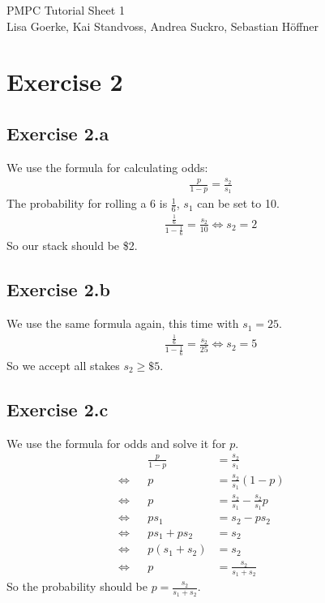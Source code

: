 \documentclass{article}
\begin{document}
\begin{center}
\LARGE PMPC Tutorial Sheet 1\\
\small Lisa Goerke, Kai Standvoss, Andrea Suckro, Sebastian H\"offner
\end{center}
\vspace{0.5cm}
\normalsize


\section*{Exercise 2}
\subsection*{Exercise 2.a}

We use the formula for calculating odds:
\begin{align}
\frac{p}{1-p} = \frac{s_2}{s_1}
\end{align}
The probability for rolling a 6 is $\frac{1}{6}$, $s_1$ can be set to 10.
\begin{align}
\frac{\frac{1}{6}}{1-\frac{1}{6}} = \frac{s_2}{10} \Leftrightarrow s_2 = 2
\end{align}
So our stack should be \$2.


\subsection*{Exercise 2.b}
We use the same formula again, this time with $s_1=25$.
\begin{align}
\frac{\frac{1}{6}}{1-\frac{1}{6}} = \frac{s_2}{25} \Leftrightarrow s_2 = 5
\end{align}
So we accept all stakes $s_2 \geq \$ 5$.


\subsection*{Exercise 2.c}
We use the formula for odds and solve it for $p$.
\begin{align}
                & & \frac{p}{1 - p} & = \frac{s_2}{s_1}                     & & \\
\Leftrightarrow & & p               & = \frac{s_2}{s_1} (1 - p)             & & \\
\Leftrightarrow & & p               & = \frac{s_2}{s_1} - \frac{s_2}{s_1} p & & \\
\Leftrightarrow & & p s_1           & = s_2 - p s_2                         & & \\
\Leftrightarrow & & p s_1 + p s_2   & = s_2                                 & & \\
\Leftrightarrow & & p (s_1 + s_2)   & = s_2                                 & & \\
\Leftrightarrow & & p               & = \frac{s_2}{s_1 + s_2}               & &
\end{align}
So the probability should be $p = \frac{s_2}{s_1 + s_2}$.
\end{document}
